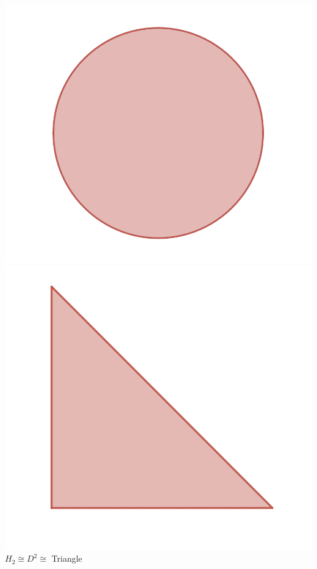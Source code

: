 \documentclass[12pt]{article}
\theoremstyle{definition}
\begin{document}
\begin{enumerate}
\begin{center}
                  \includegraphics[scale=0.4]{H_0.png} \includegraphics[scale=0.4]{triangle.png} \\
                  $H_2 \cong D^2 \cong $ Triangle


\end{center}
\end{enumerate}
\end{document}
